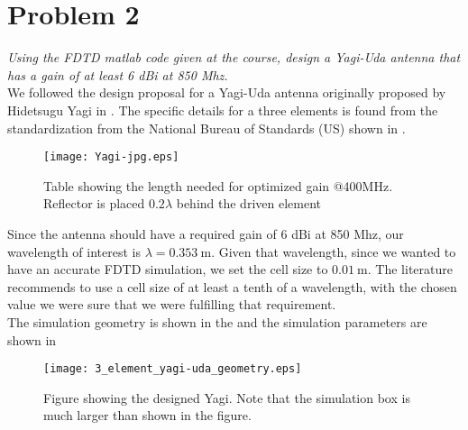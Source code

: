 \section{Problem 2}
\textit{Using the FDTD matlab code given at the course, design a Yagi-Uda antenna that has a gain of at least 6 dBi at 850 Mhz.}\\

We followed the design proposal for a Yagi-Uda antenna originally proposed by Hidetsugu Yagi in \cite{lit:YAGI}. The specific details for a three elements is found from the standardization from the National Bureau of Standards (US) shown in .

\begin{figure}[!h]
  \centering
  \texttt{[image: Yagi-jpg.eps]}
  \caption{Table showing the length needed for optimized gain @400MHz. Reflector is placed $0.2\lambda$ behind the driven element \cite[p.~7]{lit:NBS}}
  \label{tab:Yagi-jpg}
\end{figure}

Since the antenna should have a required gain of 6 dBi at 850 Mhz, our wavelength of interest is $\lambda = \SI{0.353}{\meter}$. Given that wavelength, since we wanted to have an accurate FDTD simulation, we set the cell size to $\SI{0.01}{\meter}$. The literature recommends to use a cell size of at least a tenth of a wavelength, with the chosen value we were sure that we were fulfilling that requirement.\\

The simulation geometry is shown in the  and the simulation parameters are shown in 

\begin{figure}[!h]
  \centering
  \texttt{[image: 3\_element\_yagi-uda\_geometry.eps]}
  \caption{Figure showing the designed Yagi. Note that the simulation box is much larger than shown in the figure.}
  \label{fig:3_element_yagi-uda_geometry}
\end{figure}


